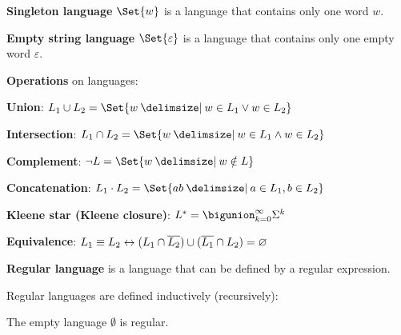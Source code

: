 \documentclass[a4paper,10pt]{article}
\begin{document}
\begin{terms}
    \item \textbf{Singleton language} $\Set{w}$ is a language that contains only one word $w$.

    \item \textbf{Empty string language} $\Set{\varepsilon}$ is a language that contains only one empty word $\varepsilon$.

    \item \textbf{Operations} on languages:

    \begin{terms}
        \item \textbf{Union}: $L_1 \union L_2 = \Set{w \given w \in L_1 \lor w \in L_2}$

        \item \textbf{Intersection}: $L_1 \intersection L_2 = \Set{w \given w \in L_1 \land w \in L_2}$

        \item \textbf{Complement}: $\neg{L} = \Set{w \given w \notin L}$

        \item \textbf{Concatenation}: $L_1 \cdot L_2 = \Set{ab \given a \in L_1, b \in L_2}$

        \item \textbf{Kleene star (Kleene closure)}: $L^* = \bigunion_{k = 0}^{\infty}\Sigma^k$
    \end{terms}

    \item \textbf{Equivalence}: $L_1 \equiv L_2 \mathrel{\leftrightarrow} (L_1 \cap \overline{L_2}) \cup (\overline{L_1} \cap L_2) = \varnothing$


    \item \textbf{Regular language} is a language that can be defined by a regular expression.

    Regular languages are defined inductively (recursively):

    \begin{terms}
        \item The empty language $\emptyset$ is regular.


\end{terms}
\end{terms}
\end{document}
